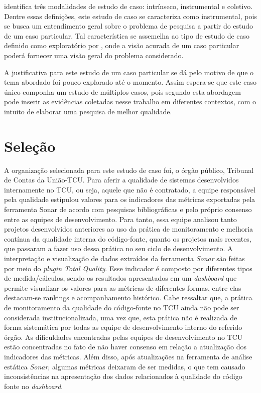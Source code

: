  identifica três modalidades de estudo de caso: intrínseco, instrumental e coletivo. Dentre essas definições, este estudo de caso se caracteriza como instrumental, pois se busca um entendimento geral sobre o problema de pesquisa a partir do estudo de um caso particular. Tal característica se assemelha ao tipo de estudo de caso definido como exploratório por , onde a visão acurada de um caso particular poderá fornecer uma visão geral do problema considerado.

A justificativa para este estudo de um caso particular se dá pelo motivo de que o tema abordado foi pouco explorado até o momento. Assim espera-se que este caso único componha um estudo de múltiplos casos, pois segundo  esta abordagem pode inserir as evidências coletadas nesse trabalho em diferentes contextos, com o intuito de elaborar uma pesquisa de melhor qualidade.

\section{Seleção} \label{sec:Seleção}

A organização selecionada para este estudo de caso foi, o órgão público, Tribunal de Contas da União-TCU. Para aferir a qualidade de sistemas desenvolvidos internamente no TCU, ou seja, aquele que não é contratado, a equipe responsável pela qualidade estipulou valores para os indicadores das métricas exportadas pela ferramenta Sonar de acordo com pesquisas bibliográficas e pelo próprio consenso entre as equipes de desenvolvimento. Para tanto, essa equipe analisou tanto projetos desenvolvidos anteriores ao uso da prática de monitoramento e melhoria contínua da qualidade interna do código-fonte, quanto os projetos mais recentes, que passaram a fazer uso dessa prática no seu ciclo de desenvolvimento. A interpretação e visualização de dados extraídos da ferramenta  \textit{Sonar} são feitas por meio do \textit{plugin Total Quality}. Esse indicador é composto por diferentes tipos de medida/cálculos, sendo os resultados apresentados em um \textit{dashboard} que permite visualizar os valores para as métricas de diferentes formas, entre elas destacam-se rankings e acompanhamento histórico. Cabe ressaltar que, a prática de monitoramento da qualidade do código-fonte no TCU ainda não pode ser considerada institucionalizada, uma vez que, esta prática não é realizada de forma sistemática por todas as equipe de desenvolvimento interno do referido órgão.
As dificuldades encontradas pelas equipes de desenvolvimento no TCU estão concentradas no fato de não haver consenso em relação a atualização dos indicadores das métricas. Além disso, após atualizações na ferramenta de análise estática \textit{Sonar}, algumas métricas deixaram de ser medidas, o que tem causado inconsistências na apresentação dos dados relacionados à qualidade do código fonte no \textit{dashboard}.


